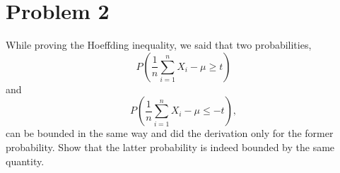 \section*{Problem 2}
\begin{myanswerbox}
While proving the Hoeffding inequality, we said that two probabilities,
\[ P\left(\frac{1}{n} \sum_{i=1}^{n} X_i - \mu \geq t \right) \]
and
\[ P\left(\frac{1}{n} \sum_{i=1}^{n} X_i - \mu \leq -t \right), \]
can be bounded in the same way and did the derivation only for the former probability. Show that the latter probability is indeed bounded by the same quantity.
\end{myanswerbox}
